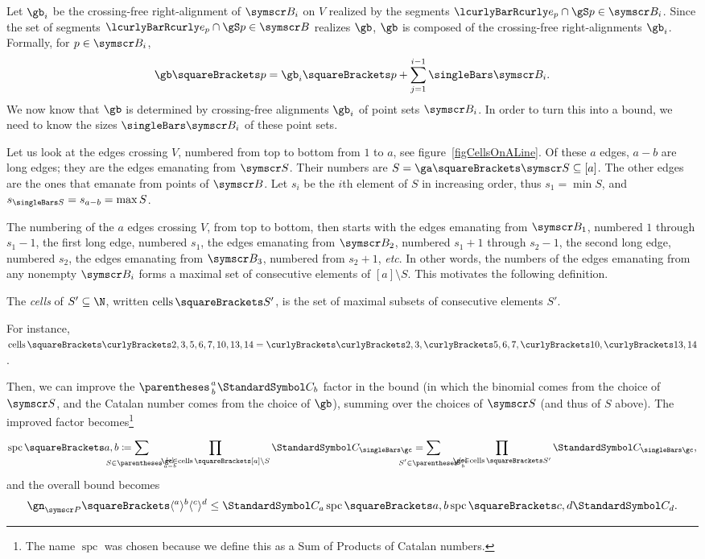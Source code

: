 \documentclass[10pt, a4paper, twoside]{basestyle}
\newcommand{\etc}{\emph{etc}}
\DeclareMathOperator{\cells}{cells}
\DeclareMathOperator{\spc}{spc}
\newcommand{\CatalanNumber}[1]{\StandardSymbol C_{#1}}
\newcommand{\pointset}{\symscr}
\begin{document}
Let $\gb_i$ be the crossing-free right-alignment of $\pointset B_i$ on $V$ realized by
the segments $\setst{e_p\Intersection \gS}{p\in\pointset B_i}$.
Since the set of segments $\setst{e_p\Intersection \gS}{p\in\pointset B}$ realizes $\gb$,
$\gb$ is composed of the crossing-free right-alignments $\gb_i$. Formally, for
$p\in\pointset B_i$,
\[\gb\of p = \gb_i\of p + \sum{j=1}[i-1] \Cardinality{\pointset B_i}\text.\]
We now know that $\gb$ is determined by crossing-free alignments $\gb_i$ of point sets $\pointset B_i$.
In order to turn this into a bound, we need to know the sizes $\Cardinality{\pointset B_i}$ of these
point sets.

Let us look at the edges crossing $V$, numbered from top to bottom from $1$ to $a$, see
figure~\ref{figCellsOnALine}. Of these $a$ edges,
$a-b$ are long edges; they are the edges emanating from $\pointset S$. 
Their numbers are $S = \ga\of{\pointset S} \Subset [a]$.
The other edges are the ones that emanate from points of $\pointset B$.
Let $s_i$ be the $i$th element of $S$ in increasing order, thus $s_1=\min S$, and
$s_{\Cardinality S} = s_{a-b} = \max S$.

The numbering of the $a$ edges crossing $V$, from top to bottom, then starts with
the edges emanating from $\pointset B_1$, numbered $1$ through
$s_1-1$, the first long edge, numbered $s_1$, the edges emanating from
$\pointset B_2$, numbered $s_1+1$ through $s_2-1$, the second long edge,
numbered $s_2$, the edges emanating from $\pointset B_3$, numbered from $s_2+1$, \etc.
In other words, the numbers of the edges emanating from any nonempty $\pointset B_i$ forms
a maximal set of consecutive elements of $[a]\setminus S$. This motivates the following
definition.

\begin{definition}
The \emph{cells} of $S'\Subset \N$, written $\cells\of{S'}$, is the set of maximal subsets of
consecutive elements $S'$.
\end{definition}
For instance, $\cells\of{\set{2,3,5,6,7,10,13,14}}=\set{\set{2,3},\set{5,6,7},\set{10},\set{13,14}}$.

Then, we can improve the $\binom a b \CatalanNumber b$ factor in the bound (in which the binomial comes from
the choice of $\pointset S$, and the Catalan number comes
from the choice of $\gb$), summing over the choices of $\pointset S$ (and thus of $S$ above).
The improved factor becomes\footnote{The name $\spc$ was chosen because we define this as
a Sum of Products of Catalan numbers.}\begin{equation}
\spc\of{a,b}\DefineAs
\sum{S\in\binom{[a]}{a-b}} \quad \prod{\gc\in\cells\of{[a] \setminus S}}\CatalanNumber {\Cardinality \gc} =
\sum{S'\in\binom{[a]}{b}} \quad \prod{\gc\in\cells\of{S'}}\CatalanNumber {\Cardinality \gc}\text,
\label{spcDefinition}
\end{equation}
and the overall bound becomes\begin{equation}
\gn_{\pointset P}\of{\langle^a\rangle^b\langle^c\rangle^d}\leq
\CatalanNumber a\spc\of{a, b}\spc\of{c, d}\CatalanNumber d\text.\label{bound-ck-spckl-spcpq-cp}
\end{equation}
\end{document}
